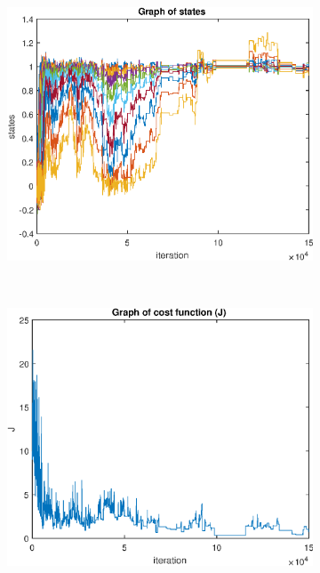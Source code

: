 \documentclass[12pt]{article}
\newenvironment{exercise}[2][Exercício]{\begin{trivlist}
\item[\hskip \labelsep {\bfseries #1}\hskip \labelsep {\bfseries #2.}]}{\end{trivlist}}
\begin{document}
\begin{exercise}{3}
\begin{figure}[H]
    \centering
    \begin{subfigure}[b]{0.45\textwidth}
        \includegraphics[width=\textwidth]{figs/ex3_states.eps}
    \end{subfigure}
    ~ 
    \begin{subfigure}[b]{0.45\textwidth}
        \includegraphics[width=\textwidth]{figs/ex3_j.eps}
    \end{subfigure}
\end{figure}

\end{exercise}
 
\end{document}
